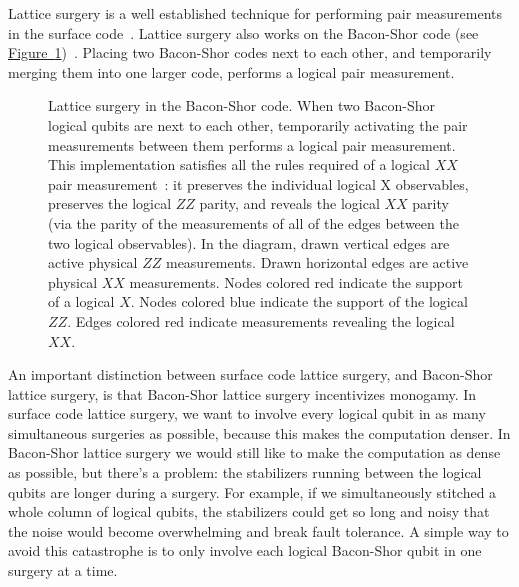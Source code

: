 \documentclass[onecolumn,unpublished,a4paper]{quantumarticle}
\theoremstyle{definition}
\theoremstyle{definition}
\theoremstyle{definition}
\newcommand{\fig}[1]{\hyperref[fig:#1]{Figure~\ref*{fig:#1}}}
\begin{document}
Lattice surgery is a well established technique for performing pair measurements in the surface code~\cite{de2017zxlattice,fowler2018latticesurgery}.
Lattice surgery also works on the Bacon-Shor code (see \fig{lattice_surgery})~\cite{poulsen2017lattice}.
Placing two Bacon-Shor codes next to each other, and temporarily merging them into one larger code, performs a logical pair measurement.

\begin{figure}[H]
    \centering
    \caption{
        Lattice surgery in the Bacon-Shor code.
        When two Bacon-Shor logical qubits are next to each other, temporarily activating the pair measurements between them performs a logical pair measurement.
        This implementation satisfies all the rules required of a logical $XX$ pair measurement~\cite{mcewen2023relaxingsurface}: it preserves the individual logical X observables, preserves the logical $ZZ$ parity, and reveals the logical $XX$ parity (via the parity of the measurements of all of the edges between the two logical observables).
        In the diagram, drawn vertical edges are active physical $ZZ$ measurements.
        Drawn horizontal edges are active physical $XX$ measurements.
        Nodes colored red indicate the support of a logical $X$.
        Nodes colored blue indicate the support of the logical $ZZ$.
        Edges colored red indicate measurements revealing the logical $XX$.
    }
    \label{fig:lattice_surgery}
\end{figure}

An important distinction between surface code lattice surgery, and Bacon-Shor lattice surgery, is that Bacon-Shor lattice surgery incentivizes monogamy.
In surface code lattice surgery, we want to involve every logical qubit in as many simultaneous surgeries as possible, because this makes the computation denser.
In Bacon-Shor lattice surgery we would still like to make the computation as dense as possible, but there's a problem: the stabilizers running between the logical qubits are longer during a surgery.
For example, if we simultaneously stitched a whole column of logical qubits, the stabilizers could get so long and noisy that the noise would become overwhelming and break fault tolerance.
A simple way to avoid this catastrophe is to only involve each logical Bacon-Shor qubit in one surgery at a time.
\end{document}
